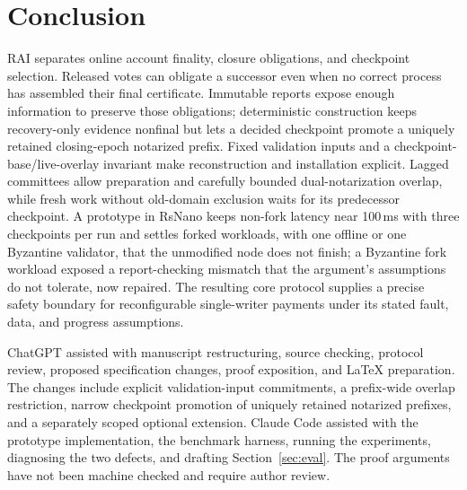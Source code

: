 \section{Conclusion}
RAI separates online account finality, closure obligations, and checkpoint selection. Released votes can obligate a successor even when no correct process has assembled their final certificate. Immutable reports expose enough information to preserve those obligations; deterministic construction keeps recovery-only evidence nonfinal but lets a decided checkpoint promote a uniquely retained closing-epoch notarized prefix. Fixed validation inputs and a checkpoint-base/live-overlay invariant make reconstruction and installation explicit. Lagged committees allow preparation and carefully bounded dual-notarization overlap, while fresh work without old-domain exclusion waits for its predecessor checkpoint. A prototype in RsNano keeps non-fork latency near 100\,ms with three checkpoints per run and settles forked workloads, with one offline or one Byzantine validator, that the unmodified node does not finish; a Byzantine fork workload exposed a report-checking mismatch that the argument's assumptions do not tolerate, now repaired. The resulting core protocol supplies a precise safety boundary for reconfigurable single-writer payments under its stated fault, data, and progress assumptions.

ChatGPT assisted with manuscript restructuring, source checking, protocol review, proposed specification changes, proof exposition, and LaTeX preparation. The changes include explicit validation-input commitments, a prefix-wide overlap restriction, narrow checkpoint promotion of uniquely retained notarized prefixes, and a separately scoped optional extension. Claude Code assisted with the prototype implementation, the benchmark harness, running the experiments, diagnosing the two defects, and drafting Section~\ref{sec:eval}. The proof arguments have not been machine checked and require author review.
